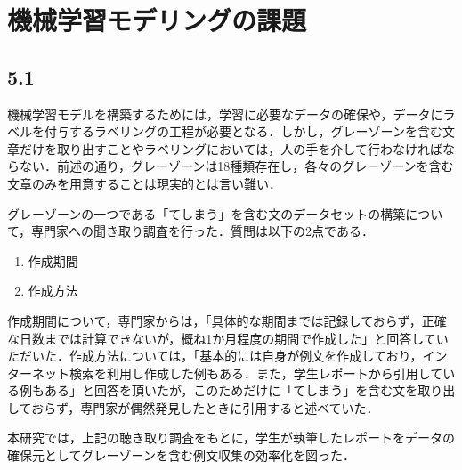 \chapter{機械学習モデリングの課題 \label{c5}}

\section{5.1 \label{c5s1}}
機械学習モデルを構築するためには，学習に必要なデータの確保や，データにラベルを付与するラベリングの工程が必要となる．しかし，グレーゾーンを含む文章だけを取り出すことやラベリングにおいては，人の手を介して行わなければならない．前述の通り，グレーゾーンは18種類存在し，各々のグレーゾーンを含む文章のみを用意することは現実的とは言い難い．

グレーゾーンの一つである「てしまう」を含む文のデータセットの構築について，専門家への聞き取り調査を行った．質問は以下の2点である．

\begin{enumerate}
    \item 作成期間
    \item 作成方法
\end{enumerate}

作成期間について，専門家からは，「具体的な期間までは記録しておらず，正確な日数までは計算できないが，概ね1か月程度の期間で作成した」と回答していただいた．作成方法については，「基本的には自身が例文を作成しており，インターネット検索を利用し作成した例もある．また，学生レポートから引用している例もある」と回答を頂いたが，このためだけに「てしまう」を含む文を取り出しておらず，専門家が偶然発見したときに引用すると述べていた．

本研究では，上記の聴き取り調査をもとに，学生が執筆したレポートをデータの確保元としてグレーゾーンを含む例文収集の効率化を図った．


